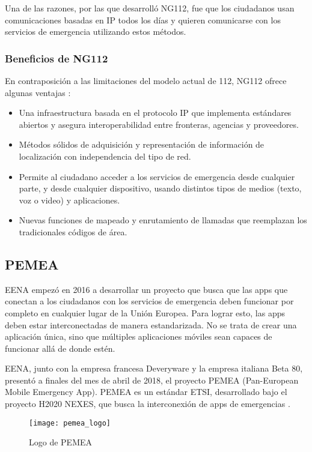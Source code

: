 Una de las razones, por las que desarrolló NG112, fue que los ciudadanos usan comunicaciones basadas en IP todos los días y quieren comunicarse con los servicios de emergencia utilizando estos métodos.

\subsubsection{Beneficios de NG112}

En contraposición a las limitaciones del modelo actual de 112, NG112 ofrece algunas ventajas \cite{ng1}:

\begin{itemize}
  \item Una infraestructura basada en el protocolo IP que implementa estándares abiertos y asegura interoperabilidad entre fronteras, agencias y proveedores.
  \item Métodos sólidos de adquisición y representación de información de localización con independencia del tipo de red.
  \item Permite al ciudadano acceder a los servicios de emergencia desde cualquier parte, y desde cualquier dispositivo, usando distintos tipos de medios (texto, voz o video) y aplicaciones.
  \item Nuevas funciones de mapeado y enrutamiento de llamadas que reemplazan los tradicionales códigos de área.
\end{itemize}

\subsection{PEMEA}

EENA empezó en 2016 a desarrollar un proyecto que busca que las apps que conectan a los ciudadanos con los servicios de emergencia deben funcionar por completo en cualquier lugar de la Unión Europea. Para lograr esto, las apps deben estar interconectadas de manera estandarizada. No se trata de crear una aplicación única, sino que múltiples aplicaciones móviles sean capaces de funcionar allá de donde estén.

EENA, junto con la empresa francesa Deveryware y la empresa italiana Beta 80, presentó a finales del mes de abril de 2018, el proyecto PEMEA (Pan-European Mobile Emergency App). PEMEA es un estándar ETSI, desarrollado bajo el proyecto H2020 NEXES, que busca la interconexión de apps de emergencias \cite{eena1}.

\begin{figure}[htp!]
  \centering
  \texttt{[image: pemea\_logo]}
  \caption{Logo de PEMEA}
  \label{fig:pemea_logo}
\end{figure}

